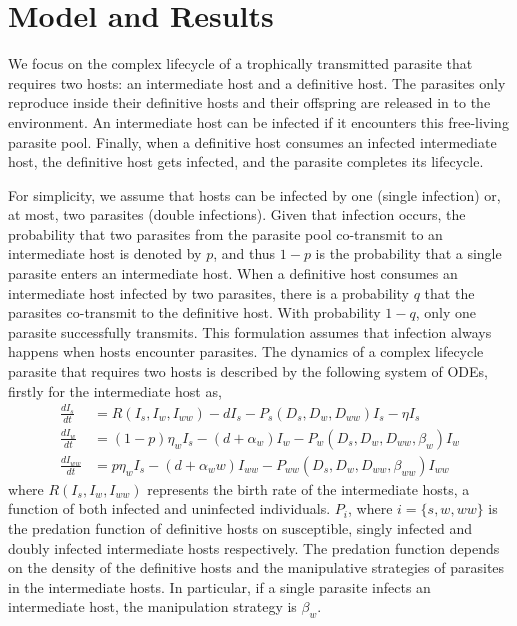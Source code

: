 \documentclass[11pt]{article}
\begin{document}
\section*{Model and Results}

We focus on the complex lifecycle of a trophically transmitted parasite that requires two hosts: an intermediate host and a definitive host. 
The parasites only reproduce inside their definitive hosts and their offspring are released in to the environment. An intermediate host can be infected if it encounters this free-living parasite pool. 
Finally, when a definitive host consumes an infected intermediate host, the definitive host gets infected, and the parasite completes its lifecycle.


For simplicity, we assume that hosts can be infected by one (single infection) or, at most, two parasites (double infections). 
Given that infection occurs, the probability that two parasites from the parasite pool co-transmit to an intermediate host is denoted by  $p$, and thus $1-p$ is the probability that a single parasite enters an intermediate host. 
When a definitive host consumes an intermediate host infected by two parasites, there is a probability $q$ that the parasites co-transmit to the definitive host.
With probability $1-q$, only one parasite successfully transmits. 
This formulation assumes that infection always happens when hosts encounter parasites.
The dynamics of a complex lifecycle parasite that requires two hosts is described by the following system of ODEs, firstly for the intermediate host as,
%
\begin{align}
\frac{dI_s}{dt} &= R(I_s, I_w, I_{ww}) - d I_s - P_s(D_s, D_w, D_{ww}) I_s  - \eta  I_s \nonumber \\ 
\frac{dI_w}{dt} &=  (1 - p) \eta_w I_s  - (d + \alpha_w) I_w - P_w(D_s, D_w, D_{ww}, \beta_w) I_w \label{odes:ihosts} \\
\frac{dI_{ww}}{dt} &= p \eta_w I_s  - (d + \alpha_ww) I_{ww} - P_{ww}(D_s, D_w, D_{ww}, \beta_{ww}) I_{ww} \nonumber
\end{align}
%
where $R(I_s, I_w, I_{ww})$ represents the birth rate of the intermediate hosts, a function of both infected and uninfected individuals.
$P_i$, where $i = \{s, w, ww\}$ is the predation function of definitive hosts on susceptible, singly infected and doubly infected intermediate hosts respectively. 
The predation function depends on the density of the definitive hosts and the manipulative strategies of parasites in the intermediate hosts. 
In particular, if a single parasite infects an intermediate host, the manipulation strategy is $\beta_w$. 
\end{document}
